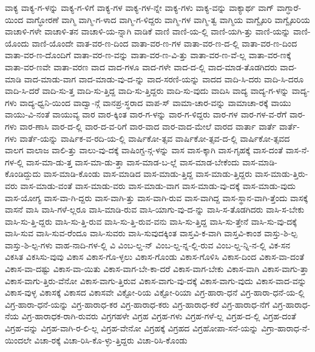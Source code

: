 {ವಾಕ್ಯ
ವಾಕ್ಯ-ಗ-ಳನ್ನು
ವಾಕ್ಯ-ಗ-ಳಿಗೆ
ವಾಕ್ಯ-ಗಳ
ವಾಕ್ಯ-ಗಳ-ನ್ನೇ
ವಾಕ್ಯ-ಗಳು
ವಾಕ್ಯ-ವನ್ನು
ವಾಕ್ಯಾರ್ಥ
ವಾಗ್
ವಾಗ್ಧಾರೆ-ಯಿಂದ
ವಾಗ್ಧೋರಣೆ
ವಾಗ್ಮಿ
ವಾಗ್ಮಿ-ಗ-ಳಾದ
ವಾಗ್ಮಿ-ಗ-ಳಿದ್ದರು
ವಾಗ್ಮಿ-ಗಳ
ವಾಗ್ಮಿ-ತ್ವ
ವಾಗ್ಮಿಯ
ವಾಗ್ವೈಖರಿ
ವಾಗ್ವೈಖರಿಯ
ವಾಚಾಳಿ-ಗಳೇ
ವಾಚಾಳಿ-ತನ
ವಾಚಾಳಿ-ಯ-ನ್ನಾಗಿ
ವಾಡಿಕೆ
ವಾಣಿ
ವಾಣಿ-ಯ-ಲ್ಲಿ
ವಾಣಿ-ಯಗಿ-ತ್ತು
ವಾಣಿ-ಯನ್ನು
ವಾಣಿ-ಯೊಂದು
ವಾಣಿ-ಯೊಂದೇ
ವಾತ-ವರ-ಣ-ದಿಂದ
ವಾತಾ-ವರ-ಣ-ಗಳ
ವಾತಾ-ವರ-ಣ-ದ-ಲ್ಲಿ
ವಾತಾ-ವರ-ಣ-ದಿಂದ
ವಾತಾ-ವರ-ಣ-ದೊಂದಿಗೆ
ವಾತಾ-ವರ-ಣ-ವನ್ನು
ವಾತಾ-ವರ-ಣ-ವಿ-ತ್ತು
ವಾತಾ-ವರ-ಣ-ವೆ-ಲ್ಲ
ವಾತಾ-ವರ-ಣಕ್ಕೆ
ವಾತಾ-ವರ-ಣವೇ
ವಾತಾ-ವರಣ
ವಾದ
ವಾದ-ಗಳೂ
ವಾದ-ಗಳೇ
ವಾದ-ದ-ಲ್ಲಿ
ವಾದ-ಮಾಡ-ತೊಡಗಿದರು
ವಾದ-ಮಾಡಿ
ವಾದ-ಮಾಡು-ವಾಗ
ವಾದ-ಮಾಡು-ವು-ದ-ನ್ನು
ವಾದ-ಸರಣಿ-ಯನ್ನು
ವಾದದ
ವಾದಿ-ಸಿ-ದರು
ವಾದಿ-ಸಿ-ದರೂ
ವಾದಿ-ಸಿ-ದರೆ
ವಾದಿ-ಸು-ತ್ತ
ವಾದಿ-ಸು-ತ್ತಿದ್ದ
ವಾದಿ-ಸು-ತ್ತಿದ್ದರು
ವಾದಿ-ಸು-ವುದು
ವಾದಿಸಿ
ವಾದ್ಯ
ವಾದ್ಯ-ಗ-ಳನ್ನು
ವಾದ್ಯ-ಗಳು
ವಾದ್ಯ-ಧ್ವನಿ-ಯಿಂದ
ವಾದ್ವಾ-ನ್ಗೆ
ವಾನಪ್ರ-ಸ್ಥರಾದ
ವಾಪ-ಸ್
ವಾಮಾ-ಚಾರ-ವನ್ನು
ವಾಮಾಚಾ-ರಕ್ಕೆ
ವಾಯು
ವಾಯು-ವಿ-ನಂತೆ
ವಾಯುವ್ಯ
ವಾರ
ವಾರ-ಕ್ಕಿಂತ
ವಾರ-ಗ-ಳನ್ನು
ವಾರ-ಗ-ಳಿದ್ದರು
ವಾರ-ಗಳ
ವಾರ-ಗಳ-ವ-ರೆಗೆ
ವಾರ-ಗಳು
ವಾರ-ಣಾಸಿ
ವಾರ-ದ-ಲ್ಲಿ
ವಾರ-ದ-ವ-ರಿಗೆ
ವಾರ-ವಾದ
ವಾರ-ವಾದ-ಮೇಲೆ
ವಾರದ
ವಾರ್ತಾ
ವಾರ್ತೆ
ವಾರ್ತೆ-ಗಳು
ವಾರ್ತೆ-ಯನ್ನು
ವಾರ್ಷಿಕ-ವ-ರದಿ-ಯ-ಲ್ಲಿ
ವಾರ್ಷಿಕೋ-ತ್ಸವ
ವಾರ್ಷಿಕೋ-ತ್ಸವ-ದ-ಲ್ಲಿ
ವಾರ್ಷಿಕೋ-ತ್ಸವದ
ವಾಲಗ
ವಾಲಾಜ
ವಾಲಿ-ತ್ತು
ವಾಲು-ವು-ದಕ್ಕೆ
ವಾಷಿಂಗ್ಟ-ನ್ಗ-ಳನ್ನು
ವಾಸ
ವಾಸ-ಕ್ಕಾಗಿ
ವಾಸ-ಗೃಹಕ್ಕೆ
ವಾಸ-ದಂತೆ
ವಾಸ-ನೆ-ಗಳ-ಲ್ಲಿ
ವಾಸ-ಮಾ-ಡು-ತ್ತ
ವಾಸ-ಮಾ-ಡು-ತ್ತಾ
ವಾಸ-ಮಾಡ-ಬ-ಲ್ಲೆ
ವಾಸ-ಮಾಡ-ಬೇಕೆಂದು
ವಾಸ-ಮಾಡಿ-ಕೊಂಡಿದ್ದುದು
ವಾಸ-ಮಾಡಿ-ಕೊಂಡು
ವಾಸ-ಮಾಡಿದ
ವಾಸ-ಮಾಡು-ತ್ತಿದ್ದ
ವಾಸ-ಮಾಡು-ತ್ತಿದ್ದರು
ವಾಸ-ಮಾಡು-ತ್ತಿರು-ವರು
ವಾಸ-ಮಾಡು-ವಂತೆ
ವಾಸ-ಮಾಡು-ವರು
ವಾಸ-ಮಾಡು-ವಾಗ
ವಾಸ-ಮಾಡು-ವು-ದಕ್ಕೆ
ವಾಸ-ಮಾಡು-ವುದು
ವಾಸ-ಯೋಗ್ಯ
ವಾಸ-ವಾ-ಗಿ-ದ್ದರು
ವಾಸ-ವಾಗಿ-ತ್ತು
ವಾಸ-ವಾಗಿ-ರುವ
ವಾಸ-ವಾಗಿದ್ದ
ವಾಸ-ಸ್ಥಾನ-ವಾಗಿ-ತ್ತೆಂದು
ವಾಸಕ್ಕೆ
ವಾಸನೆ
ವಾಸಿ
ವಾಸಿ-ಗಳೆ-ಲ್ಲರೂ
ವಾಸಿ-ಮಾಡಿ-ರುವ
ವಾಸಿ-ಯಾಗು-ವು-ದ-ನ್ನು
ವಾಸಿ-ಸ-ತೊಡಗಿದರು
ವಾಸಿ-ಸ-ಬೇಕು
ವಾಸಿ-ಸು-ತ್ತಿ-ದ್ದರು
ವಾಸಿ-ಸು-ತ್ತಿ-ರುವ
ವಾಸಿ-ಸು-ತ್ತಿ-ರುವ-ವನು
ವಾಸಿ-ಸು-ತ್ತಿದ್ದ
ವಾಸಿ-ಸು-ತ್ತೇನೆ
ವಾಸಿ-ಸು-ವು-ದಕ್ಕೆ
ವಾಸಿ-ಸುವ
ವಾಸಿ-ಸುವ-ರೆಂದೂ
ವಾಸಿ-ಸುವರು
ವಾಸಿ-ಸುವುದಕ್ಕಿಂತ
ವಾಸ್ತವಿ-ಕ-ವಾಗಿ
ವಾಸ್ತವಿ-ಕಾಂಶ
ವಾಸ್ತು-ಶಿ-ಲ್ಪ
ವಾಸ್ತು-ಶಿ-ಲ್ಪ-ಗಳು
ವಾಹ-ನಾದಿ-ಗಳ-ಲ್ಲಿ
ವಿ
ವಿಂಬ-ಲ್ಡ-ನ್
ವಿಂಬ-ಲ್ಡ-ನ್ನ-ಲ್ಲಿ-ರುವ
ವಿಂಬ-ಲ್ಡ-ನ್ನಿ-ನ-ಲ್ಲಿ
ವಿಕ-ಸನ
ವಿಕಸಿತ
ವಿಕಸಿಸು-ವುವು
ವಿಕಾಸ
ವಿಕಾಸ-ಗೊ-ಳ್ಳಲು
ವಿಕಾಸ-ಗೊಂಡು
ವಿಕಾಸ-ಗೊಳಿಸಿ
ವಿಕಾಸ-ದಿಂದ
ವಿಕಾಸ-ವಾ-ದಂತೆ
ವಿಕಾಸ-ವಾ-ದಷ್ಟು
ವಿಕಾಸ-ವಾ-ಯಿತು
ವಿಕಾಸ-ವಾಗ-ಬೇ-ಕಾ-ದರೆ
ವಿಕಾಸ-ವಾಗ-ಬೇಕು
ವಿಕಾಸ-ವಾಗಿ
ವಿಕಾಸ-ವಾಗು-ತ್ತಾ
ವಿಕಾಸ-ವಾಗು-ತ್ತಿರು-ವೆನೋ
ವಿಕಾಸ-ವಾಗು-ತ್ತಿರುವ
ವಿಕಾಸ-ವಾಗು-ವು-ದಕ್ಕೆ
ವಿಕಾಸ-ವಾಗು-ವುದು
ವಿಕಾಸ-ವಾದ-ವನ್ನು
ವಿಕಾಸ-ವುಳ್ಳ
ವಿಕಾಸಕ್ಕೆ
ವಿಕಾಸದ
ವಿಕಾಸವೇ
ವಿಕ್ಟೋ-ರಿಯ
ವಿಕ್ಟೋ-ರಿಯಾ
ವಿಗ್ರ-ಹಾರಾ-ಧನೆ
ವಿಗ್ರ-ಹಾರಾ-ಧನೆ-ಯ-ಲ್ಲಿ
ವಿಗ್ರ-ಹಾರಾ-ಧನೆ-ಯನ್ನು
ವಿಗ್ರ-ಹಾರಾಧ-ಕರ
ವಿಗ್ರ-ಹಾರಾಧ-ಕರು
ವಿಗ್ರ-ಹಾರಾಧ-ಕರೆ
ವಿಗ್ರ-ಹಾರಾಧ-ನೆಗೆ
ವಿಗ್ರ-ಹಾರಾಧ-ನೆಯ
ವಿಗ್ರ-ಹಾರಾಧಕ-ರಾಗಿ-ರುವರು
ವಿಗ್ರಗಹಳೇ
ವಿಗ್ರಹ
ವಿಗ್ರಹ-ಗಳು
ವಿಗ್ರಹ-ಗಳೆ-ಲ್ಲ
ವಿಗ್ರಹ-ದ-ಲ್ಲಿ
ವಿಗ್ರಹ-ದಂತೆ
ವಿಗ್ರಹ-ವನ್ನು
ವಿಗ್ರಹ-ವಾಗಿ-ರ-ಲಿ-ಲ್ಲ
ವಿಗ್ರಹ-ವೇನೋ
ವಿಗ್ರಹಕ್ಕೆ
ವಿಗ್ರಹದ
ವಿಗ್ರಹೋಪಾ-ಸನೆ-ಯನ್ನು
ವಿಗ್ರಾ-ಹಾರಾಧ-ನೆ-ಯಿಂದಲೇ
ವಿಚಾ-ರಕ್ಕೆ
ವಿಚಾ-ರಿಸಿ-ಕೊ-ಳ್ಳು-ತ್ತಿದ್ದರು
ವಿಚಾ-ರಿಸಿ-ಕೊಂಡು
}
